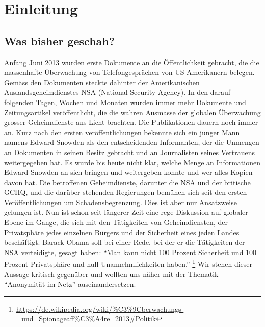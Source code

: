 \newpage
\section{Einleitung}

\subsection{Was bisher geschah?}
Anfang Juni 2013 wurden erste Dokumente an die Öffentlichkeit gebracht, die die massenhafte Überwachung von Telefongesprächen von US-Amerikanern belegen. Gemäss den Dokumenten steckte dahinter der Amerikanischen Auslandsgeheimdienstes NSA (National Security Agency). In den darauf folgenden Tagen, Wochen und Monaten wurden immer mehr Dokumente und Zeitungsartikel veröffentlicht, die die wahren Ausmasse der globalen Überwachung grosser Geheimdienste ans Licht brachten. Die Publikationen dauern noch immer an. Kurz nach den ersten veröffentlichungen bekennte sich ein junger Mann namens Edward Snowden als den entscheidenden Informanten, der die Unmengen an Dokumenten in seinen Besitz gebracht und an Journalisten seines Vertrauens weitergegeben hat. Es wurde bis heute nicht klar, welche Menge an Informationen Edward Snowden an sich bringen und weitergeben konnte und wer alles Kopien davon hat. Die betroffenen Geheimdienste, darunter die NSA und der britische GCHQ, und die darüber stehenden Regierungen bemühen sich seit den ersten Veröffentlichungen um Schadensbegrenzung. Dies ist aber nur Ansatzweise gelungen ist. Nun ist schon seit längerer Zeit eine rege Diskussion auf globaler Ebene im Gange, die sich mit den Tätigkeiten von Geheimdiensten, der Privatsphäre jedes einzelnen Bürgers und der Sicherheit eines jeden Landes beschäftigt. Barack Obama soll bei einer Rede, bei der er die Tätigkeiten der NSA verteidigte, gesagt haben: ``Man kann nicht 100 Prozent Sicherheit und 100 Prozent Privatsphäre und null Unannehmlichkeiten haben.''
\footnote{\url{https://de.wikipedia.org/wiki/\%C3\%9Cberwachungs-_und_Spionageaff\%C3\%A4re_2013\#Politik}}
Wir stehen dieser Aussage kritisch gegenüber und wollten uns näher mit der Thematik ``Anonymität im Netz'' auseinandersetzen.

